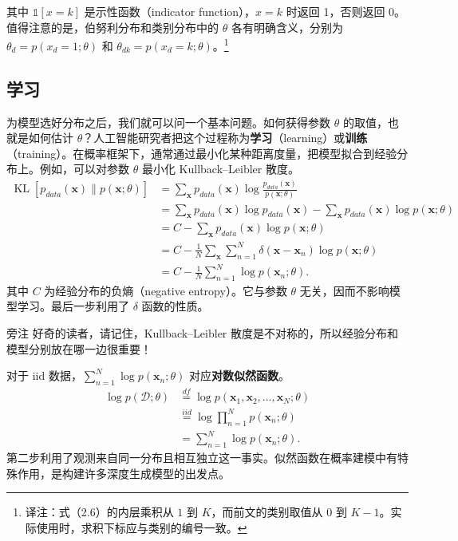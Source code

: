 其中 $\mathbb{1}[x=k]$ 是示性函数（indicator function），$x=k$ 时返回 1，否则返回 0。值得注意的是，伯努利分布和类别分布中的 $\theta$ 各有明确含义，分别为 $\theta_d=p(x_d=1;\theta)$ 和 $\theta_{dk}=p(x_d=k;\theta)$。\footnote{译注：式（2.6）的内层乘积从 $1$ 到 $K$，而前文的类别取值从 $0$ 到 $K-1$。实际使用时，求积下标应与类别的编号一致。}

\subsection{学习}
为模型选好分布之后，我们就可以问一个基本问题。如何获得参数 $\theta$ 的取值，也就是如何估计 $\theta$？人工智能研究者把这个过程称为\textbf{学习}（learning）或\textbf{训练}（training）。在概率框架下，通常通过最小化某种距离度量，把模型拟合到经验分布上。例如，可以对参数 $\theta$ 最小化 Kullback–Leibler 散度。
\begin{align}
\operatorname{KL}[p_{\mathit{data}}(\mathbf{x})\mathbin{\|}p(\mathbf{x};\theta)]
 &=\sum_{\mathbf{x}}p_{\mathit{data}}(\mathbf{x})\log
        \frac{p_{\mathit{data}}(\mathbf{x})}{p(\mathbf{x};\theta)}
        \tag{2.8}\label{eq:02-08}\\
 &=\sum_{\mathbf{x}}p_{\mathit{data}}(\mathbf{x})\log p_{\mathit{data}}(\mathbf{x})
       -\sum_{\mathbf{x}}p_{\mathit{data}}(\mathbf{x})\log p(\mathbf{x};\theta)
        \tag{2.9}\label{eq:02-09}\\
 &=C-\sum_{\mathbf{x}}p_{\mathit{data}}(\mathbf{x})\log p(\mathbf{x};\theta)
        \tag{2.10}\label{eq:02-10}\\
 &=C-\frac1N\sum_{\mathbf{x}}\sum_{n=1}^{N}
        \delta(\mathbf{x}-\mathbf{x}_n)\log p(\mathbf{x};\theta)
        \tag{2.11}\label{eq:02-11}\\
 &=C-\frac1N\sum_{n=1}^{N}\log p(\mathbf{x}_n;\theta).
        \tag{2.12}\label{eq:02-12}
\end{align}
其中 $C$ 为经验分布的负熵（negative entropy）。它与参数 $\theta$ 无关，因而不影响模型学习。最后一步利用了 $\delta$ 函数的性质。

\begin{booknote}{旁注}
好奇的读者，请记住，Kullback–Leibler 散度是不对称的，所以经验分布和模型分别放在哪一边很重要！
\end{booknote}

对于 iid 数据，$\sum_{n=1}^{N}\log p(\mathbf{x}_n;\theta)$ 对应\textbf{对数似然函数}。
\begin{align}
\log p(\mathcal{D};\theta)&\overset{\mathit{df}}{=}
   \log p(\mathbf{x}_1,\mathbf{x}_2,\ldots,\mathbf{x}_N;\theta)
       \tag{2.13}\label{eq:02-13}\\
 &\overset{\mathit{iid}}{=}\log\prod_{n=1}^{N}p(\mathbf{x}_n;\theta)
       \tag{2.14}\label{eq:02-14}\\
 &=\sum_{n=1}^{N}\log p(\mathbf{x}_n;\theta).
       \tag{2.15}\label{eq:02-15}
\end{align}
第二步利用了观测来自同一分布且相互独立这一事实。似然函数在概率建模中有特殊作用，是构建许多深度生成模型的出发点。

